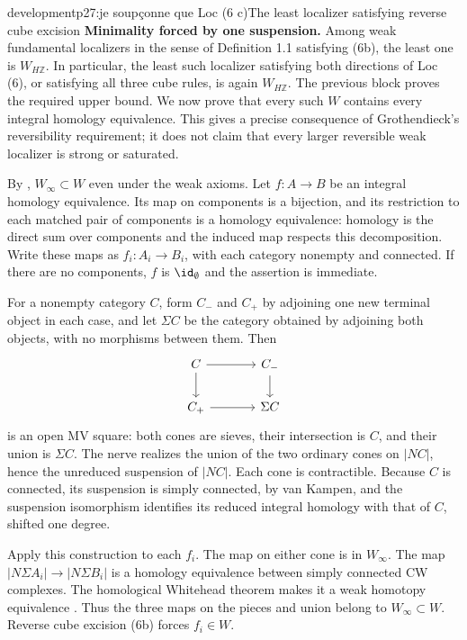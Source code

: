 \begin{dcomment}{development}{p27:je soupçonne que Loc (6 c)}{The least localizer satisfying reverse cube excision}
\textbf{Minimality forced by one suspension.}\ours
Among weak fundamental localizers in the sense of Definition 1.1 satisfying (6b), the least one is $W_{H\mathbb Z}$. In particular, the least such localizer satisfying both directions of Loc (6), or satisfying all three cube rules, is again $W_{H\mathbb Z}$. The previous block proves the required upper bound. We now prove that every such $W$ contains every integral homology equivalence. This gives a precise consequence of Grothendieck's reversibility requirement; it does not claim that every larger reversible weak localizer is strong or saturated.

By \citet[Theorem 6.1.18]{Cisinski2006}, $W_\infty\subset W$ even under the weak axioms. Let $f:A\to B$ be an integral homology equivalence. Its map on components is a bijection, and its restriction to each matched pair of components is a homology equivalence: homology is the direct sum over components and the induced map respects this decomposition. Write these maps as $f_i:A_i\to B_i$, with each category nonempty and connected. If there are no components, $f$ is $\id_\emptyset$ and the assertion is immediate.

For a nonempty category $C$, form $C_-$ and $C_+$ by adjoining one new terminal object in each case, and let $\Sigma C$ be the category obtained by adjoining both objects, with no morphisms between them. Then
\[
\begin{tikzcd}[column sep=large]
C\arrow[r]\arrow[d] & C_-\arrow[d]\\
C_+\arrow[r] & \Sigma C
\end{tikzcd}
\]
is an open MV square: both cones are sieves, their intersection is $C$, and their union is $\Sigma C$. The nerve realizes the union of the two ordinary cones on $|NC|$, hence the unreduced suspension of $|NC|$. Each cone is contractible. Because $C$ is connected, its suspension is simply connected, by van Kampen, and the suspension isomorphism identifies its reduced integral homology with that of $C$, shifted one degree.

Apply this construction to each $f_i$. The map on either cone is in $W_\infty$. The map $|N\Sigma A_i|\to|N\Sigma B_i|$ is a homology equivalence between simply connected CW complexes. The homological Whitehead theorem makes it a weak homotopy equivalence \citep[Corollary 4.33, pp.~367--368]{Hatcher2002}. Thus the three maps on the pieces and union belong to $W_\infty\subset W$. Reverse cube excision (6b) forces $f_i\in W$.


\end{dcomment}
